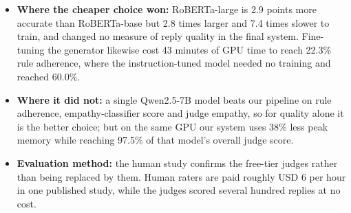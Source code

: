 \begin{itemize}
  \item \textbf{Where the cheaper choice won: }RoBERTa-large is 2.9 points more accurate than RoBERTa-base but 2.8 times larger and 7.4 times slower to train, and changed no measure of reply quality in the final system. Fine-tuning the generator likewise cost 43 minutes of GPU time to reach 22.3\% rule adherence, where the instruction-tuned model needed no training and reached 60.0\%.
  \item \textbf{Where it did not:} a single Qwen2.5-7B model beats our pipeline on rule adherence, empathy-classifier score and judge empathy, so for quality alone it is the better choice; but on the same GPU our system uses 38\% less peak memory while reaching 97.5\% of that model's overall judge score.
  \item \textbf{Evaluation method:} the human study confirms the free-tier judges rather than being replaced by them. Human raters are paid roughly USD 6 per hour in one published study, while the judges scored several hundred replies at no cost.
\end{itemize}
